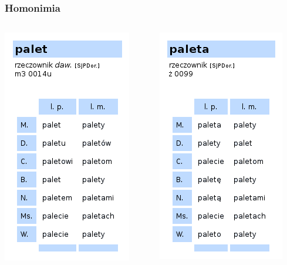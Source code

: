 \documentclass[xcolor=dvipsnames,polish]{beamer}
\begin{document}
\begin{frame}%
  \frametitle{Homonimia}


\begin{columns}
  \begin{column}{.28\textwidth}
\includegraphics[scale=0.65]{img/palet.png}

  \end{column}

  \begin{column}{.28\textwidth}
\includegraphics[scale=0.65]{img/paleta.png}
  \end{column}


\end{columns}
\end{frame}
\end{document}

